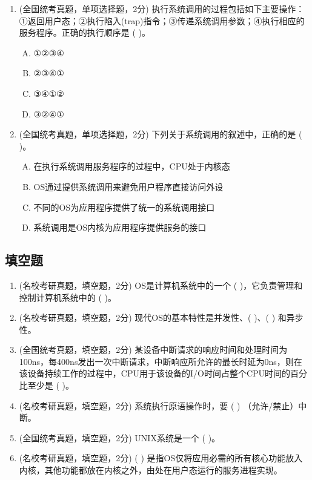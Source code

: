 \documentclass[lang=cn,newtx,10pt,scheme=chinese]{../../elegantbook}
\begin{document}
\begin{enumerate}
    \item (全国统考真题，单项选择题，2分) 执行系统调用的过程包括如下主要操作：①返回用户态；②执行陷入(trap)指令；③传递系统调用参数；④执行相应的服务程序。正确的执行顺序是 (    )。
    \begin{enumerate}[A.]
        \item ①②③④
        \item ②③④①
        \item ③④①②
        \item ③②④①
    \end{enumerate}

    \item (全国统考真题，单项选择题，2分) 下列关于系统调用的叙述中，正确的是 (    )。
    \begin{enumerate}[A.]
        \item 在执行系统调用服务程序的过程中，CPU处于内核态
        \item OS通过提供系统调用来避免用户程序直接访问外设
        \item 不同的OS为应用程序提供了统一的系统调用接口
        \item 系统调用是OS内核为应用程序提供服务的接口
    \end{enumerate}
\end{enumerate}

\subsection{填空题}

\begin{enumerate}
    \item (名校考研真题，填空题，2分) OS是计算机系统中的一个 (    )，它负责管理和控制计算机系统中的 (    )。

    \item (名校考研真题，填空题，2分) 现代OS的基本特性是并发性、(    )、(    ) 和异步性。

    \item (全国统考真题，填空题，2分) 某设备中断请求的响应时间和处理时间为100ns，每400ns发出一次中断请求，中断响应所允许的最长时延为0ns，则在该设备持续工作的过程中，CPU用于该设备的I/O时间占整个CPU时间的百分比至少是 (    )。

    \item (名校考研真题，填空题，2分) 系统执行原语操作时，要 (    ) （允许/禁止）中断。

    \item (全国统考真题，填空题，2分) UNIX系统是一个 (    )。

    \item (名校考研真题，填空题，2分) (    ) 是指OS仅将应用必需的所有核心功能放入内核，其他功能都放在内核之外，由处在用户态运行的服务进程实现。
\end{enumerate}
\end{document}
